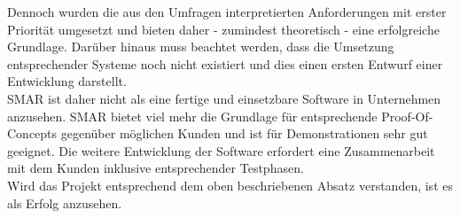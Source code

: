 Dennoch wurden die aus den Umfragen interpretierten Anforderungen mit erster Priorität umgesetzt und bieten daher - zumindest theoretisch - eine erfolgreiche Grundlage. Darüber hinaus muss beachtet werden, dass die Umsetzung entsprechender Systeme noch nicht existiert und dies einen ersten Entwurf einer Entwicklung darstellt.\\

\ac{SMAR} ist daher nicht als eine fertige und einsetzbare Software in Unternehmen anzusehen. \ac{SMAR} bietet viel mehr die Grundlage für entsprechende Proof-Of-Concepts gegenüber möglichen Kunden und ist für Demonstrationen sehr gut geeignet. Die weitere Entwicklung der Software erfordert eine Zusammenarbeit mit dem Kunden inklusive entsprechender Testphasen.\\

Wird das Projekt entsprechend dem oben beschriebenen Absatz verstanden, ist es als Erfolg anzusehen.